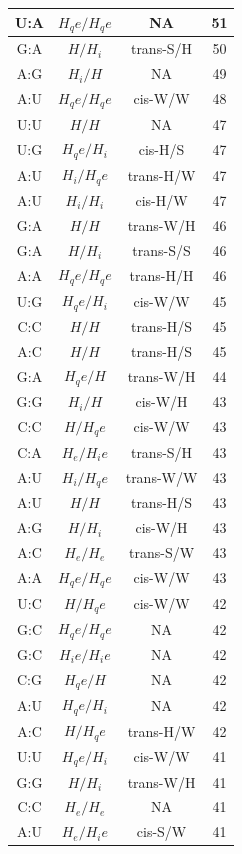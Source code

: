 \begin{center}
\begin{longtable}{c|c|c|c}
U:A & $H_qe/H_qe$ & NA & 51 \\  \hline
G:A & $H/H_i$ & trans-S/H & 50 \\  \hline
A:G & $H_i/H$ & NA & 49 \\  \hline
A:U & $H_qe/H_qe$ & cis-W/W & 48 \\  \hline
U:U & $H/H$ & NA & 47 \\  \hline
U:G & $H_qe/H_i$ & cis-H/S & 47 \\  \hline
A:U & $H_i/H_qe$ & trans-H/W & 47 \\  \hline
A:U & $H_i/H_i$ & cis-H/W & 47 \\  \hline
G:A & $H/H$ & trans-W/H & 46 \\  \hline
G:A & $H/H_i$ & trans-S/S & 46 \\  \hline
A:A & $H_qe/H_qe$ & trans-H/H & 46 \\  \hline
U:G & $H_qe/H_i$ & cis-W/W & 45 \\  \hline
C:C & $H/H$ & trans-H/S & 45 \\  \hline
A:C & $H/H$ & trans-H/S & 45 \\  \hline
G:A & $H_qe/H$ & trans-W/H & 44 \\  \hline
G:G & $H_i/H$ & cis-W/H & 43 \\  \hline
C:C & $H/H_qe$ & cis-W/W & 43 \\  \hline
C:A & $H_e/H_ie$ & trans-S/H & 43 \\  \hline
A:U & $H_i/H_qe$ & trans-W/W & 43 \\  \hline
A:U & $H/H$ & trans-H/S & 43 \\  \hline
A:G & $H/H_i$ & cis-W/H & 43 \\  \hline
A:C & $H_e/H_e$ & trans-S/W & 43 \\  \hline
A:A & $H_qe/H_qe$ & cis-W/W & 43 \\  \hline
U:C & $H/H_qe$ & cis-W/W & 42 \\  \hline
G:C & $H_qe/H_qe$ & NA & 42 \\  \hline
G:C & $H_ie/H_ie$ & NA & 42 \\  \hline
C:G & $H_qe/H$ & NA & 42 \\  \hline
A:U & $H_qe/H_i$ & NA & 42 \\  \hline
A:C & $H/H_qe$ & trans-H/W & 42 \\  \hline
U:U & $H_qe/H_i$ & cis-W/W & 41 \\  \hline
G:G & $H/H_i$ & trans-W/H & 41 \\  \hline
C:C & $H_e/H_e$ & NA & 41 \\  \hline
A:U & $H_e/H_ie$ & cis-S/W & 41 \\  \hline

\end{longtable}
\end{center}
